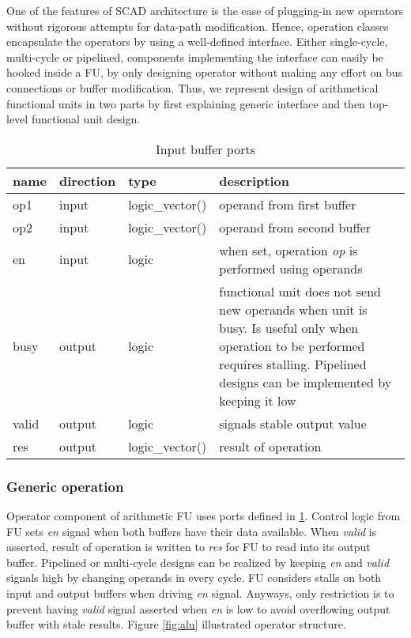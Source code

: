 	One of the features of SCAD architecture is the ease of plugging-in new operators without rigorous attempts for data-path modification. Hence, operation classes encapsulate the operators by using a well-defined interface. Either single-cycle, multi-cycle or pipelined, components implementing the interface can easily be hooked inside a FU, by only designing operator without making any effort on bus connections or buffer modification. Thus, we represent design of arithmetical functional units in two parts by first explaining generic interface and then top-level functional unit design.
	\begin{table}
		\begin{tabular}{| l| l | l | p{8cm} |}
			\hline
			\textbf{name} & \textbf{direction} & \textbf{type} &  \textbf{description}\\ \hline
			op1 & input & logic\_vector(\dataW) & operand from first buffer \\ \hline
			op2 & input & logic\_vector(\dataW) & operand from second buffer \\ \hline
			en & input & logic & when set, operation \textit{op} is performed using operands \\ \hline
			busy & output & logic & functional unit does not send new operands when unit is busy. Is useful only when operation to be performed requires stalling. Pipelined designs can be implemented by keeping it low   \\ \hline
			valid & output & logic & signals stable output value   \\ \hline
			res & output & logic\_vector(\dataW) & result of operation   \\ \hline
		\end{tabular}
		
		\caption{Input buffer ports \label{table:alu_description}}
		\centering
	\end{table}
	\subsubsection{Generic operation} \label{generic}
	
	Operator component of arithmetic FU uses ports defined in \ref{table:alu_description}. Control logic from FU sets \textit{en} signal when both buffers have their data available. When \textit{valid} is asserted, result of operation is written to \textit{res} for FU to read into its output buffer. Pipelined or multi-cycle designs can be realized by keeping \textit{en} and \textit{valid} signals high by changing operands in every cycle. FU considers stalls on both input and output buffers when driving \textit{en} signal. Anyways, only restriction is to prevent having \textit{valid} signal asserted when \textit{en} is low to avoid overflowing output buffer with stale results. Figure \ref{fig:alu} illustrated operator structure.
	
